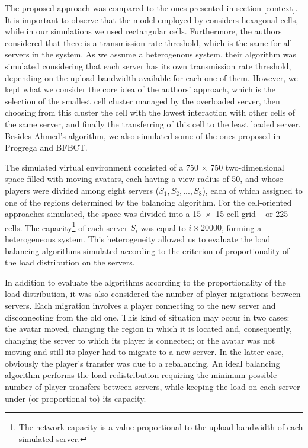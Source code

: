 \documentclass[acmjacm]{acmtrans2m}
\begin{document}
The proposed approach was compared to the ones presented in section \ref{context}. It is important to observe that the model employed by \cite{ahmed2008mol} considers hexagonal cells, while in our simulations we used rectangular cells. Furthermore, the authors considered that there is a transmission rate threshold, which is the same for all servers in the system. As we assume a heterogenous system, their algorithm was simulated considering that each server has its own transmission rate threshold, depending on the upload bandwidth available for each one of them. However, we kept what we consider the core idea of the authors' approach, which is the selection of the smallest cell cluster managed by the overloaded server, then choosing from this cluster the cell with the lowest interaction with other cells of the same server, and finally the transferring of this cell to the least loaded server. Besides Ahmed's algorithm, we also simulated some of the ones proposed in \cite{bezerra2009lbs} -- Progrega and BFBCT.

The simulated virtual environment consisted of a 750 $\times$ 750 two-dimensional space filled with moving avatars, each having a view radius of 50, and whose players were divided among eight servers ($S_1, S_2, ..., S_8$), each of which assigned to one of the regions determined by the balancing algorithm. For the cell-oriented approaches simulated, the space was divided into a \mbox{15 $\times$ 15} cell grid -- or 225 cells. The capacity\footnote{The network capacity is a value proportional to the upload bandwidth of each simulated server.} of each server $S_i$ was equal to $i \times 20000$, forming a heterogeneous system. This heterogeneity allowed us to evaluate the load balancing algorithms simulated according to the criterion of proportionality of the load distribution on the servers.

In addition to evaluate the algorithms according to the proportionality of the load distribution, it was also considered the number of player migrations between servers. Each migration involves a player connecting to the new server and disconnecting from the old one. This kind of situation may occur in two cases: the avatar moved, changing the region in which it is located and, consequently, changing the server to which its player is connected; or the avatar was not moving and still its player had to migrate to a new server. In the latter case, obviously the player's transfer was due to a rebalancing. An ideal balancing algorithm performs the load redistribution requiring the minimum possible number of player transfers between servers, while keeping the load on each server under (or proportional to) its capacity.
\end{document}
